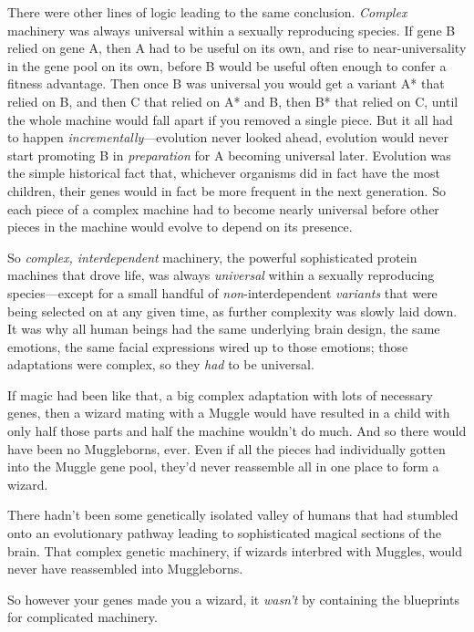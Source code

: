 There were other lines of logic leading to the same conclusion. \emph{Complex}
machinery was always universal within a sexually reproducing species. If gene B
relied on gene A, then A had to be useful on its own, and rise to
near-universality in the gene pool on its own, before B would be useful often
enough to confer a fitness advantage. Then once B was universal you would get a
variant A* that relied on B, and then C that relied on A* and B, then B* that
relied on C, until the whole machine would fall apart if you removed a single
piece. But it all had to happen \emph{incrementally}---evolution never looked
ahead, evolution would never start promoting B in \emph{preparation} for A
becoming universal later. Evolution was the simple historical fact that,
whichever organisms did in fact have the most children, their genes would in
fact be more frequent in the next generation. So each piece of a complex
machine had to become nearly universal before other pieces in the machine would
evolve to depend on its \mbox{presence}.

So \emph{complex, interdependent} machinery, the powerful sophisticated protein
machines that drove life, was always \emph{universal} within a sexually
reproducing species---except for a small handful of \emph{non}-interdependent
\emph{variants} that were being selected on at any given time, as further
complexity was slowly laid down. It was why all human beings had the same
underlying brain design, the same emotions, the same facial expressions wired
up to those emotions; those adaptations were complex, so they \emph{had} to be
universal.

If magic had been like that, a big complex adaptation with lots of necessary
genes, then a wizard mating with a Muggle would have resulted in a child with
only half those parts and half the machine wouldn't do much. And so there would
have been no Muggleborns, ever. Even if all the pieces had individually gotten
into the Muggle gene pool, they'd never reassemble all in one place to form a
wizard.

There hadn't been some genetically isolated valley of humans that had stumbled
onto an evolutionary pathway leading to sophisticated magical sections of the
brain. That complex genetic machinery, if wizards interbred with Muggles, would
never have reassembled into Muggleborns.

So however your genes made you a wizard, it \emph{wasn't} by containing the
blueprints for complicated machinery.

